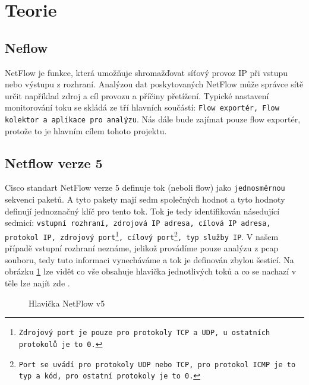 \documentclass[12pt]{article}
\begin{document}
\section{Teorie}
\subsection{Neflow}
NetFlow \cite{NT} je funkce, která umožňuje shromažďovat síťový provoz IP při vstupu nebo výstupu z rozhraní.
Analýzou dat poskytovaných NetFlow může správce sítě určit například zdroj a cíl provozu a příčiny přetížení. 
Typické nastavení monitorování toku se skládá ze tří hlavních součástí: \texttt{Flow exportér, Flow kolektor a aplikace pro analýzu}. Nás dále bude zajímat pouze flow exportér, protože to je hlavním cílem tohoto projektu.

\subsection{Netflow verze 5}
Cisco standart NetFlow verze 5 definuje tok (neboli flow) jako \texttt{jednosměrnou} sekvenci paketů. A tyto pakety mají sedm společných hodnot a tyto
hodnoty definují jednoznačný klíč pro tento tok. Tok je tedy identifikován násedující sedmicí: \texttt{vstupní rozhraní, zdrojová IP adresa, cílová IP adresa, protokol IP, 
zdrojový port\footnote{Zdrojový port je pouze pro protokoly TCP a UDP, u ostatních protokolů je to 0.}, cílový port\footnote{Port se uvádí pro protokoly UDP nebo TCP, pro protokol ICMP je to typ a kód, pro ostatní protokoly je to 0.}, typ služby IP}.
V našem případě vstupní rozhraní neznáme, jelikož provádíme pouze analýzu z pcap souboru, tedy tuto informaci vynecháváme a tok je definován zbylou šesticí.
Na obrázku \ref{picture} lze vidět co vše obsahuje hlavička jednotlivých toků a co se nachazí v těle lze najít zde \cite{NTv5}.
\begin{figure}[H]
	\begin{center}
	\caption{Hlavička NetFlow v5}
	\label{picture}
	\end{center}
\end{figure}
\end{document}
